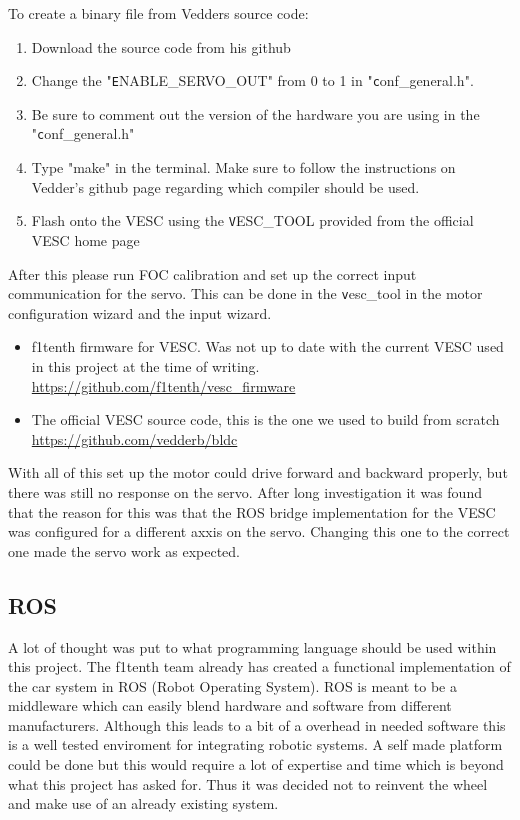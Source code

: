 \documentclass{article}
\begin{document}
	To create a binary file from Vedders source code:

	\begin{enumerate}
		\item Download the source code from his github
		\item Change the "\texttt ENABLE\_SERVO\_OUT" from 0 to 1 in "\texttt conf\_general.h".
		\item Be sure to comment out the version of the hardware you are using in the "\texttt conf\_general.h"
		\item Type "make" in the terminal. Make sure to follow the instructions on Vedder's github page regarding which compiler should be used.
		\item Flash onto the VESC using the \texttt VESC\_TOOL provided from the official VESC home page
	\end{enumerate}

After this please run FOC calibration and set up the correct input communication for the servo. This can be done in the \texttt vesc\_tool in the motor configuration wizard and the input wizard.

	\begin{itemize}
		\item f1tenth firmware for VESC. Was not up to date with the current VESC used in this project at the time of writing. \\
			\url{https://github.com/f1tenth/vesc_firmware} 
	
		\item The official VESC source code, this is the one we used to build from scratch \\
			\url{https://github.com/vedderb/bldc} 
	\end{itemize}
	
	With all of this set up the motor could drive forward and backward properly, but there was still no response on the servo. After long investigation it was found that the reason for this was that the ROS bridge implementation for the VESC was configured for a different axxis on the servo. Changing this one to the correct one made the servo work as expected.

	
	\subsection{ROS}
		A lot of thought was put to what programming language should be used within this project. The f1tenth team already has created a functional implementation of the car system in ROS (Robot Operating System). ROS is meant to be a middleware which can easily blend hardware and software from different manufacturers. Although this leads to a bit of a overhead in needed software this is a well tested enviroment for integrating robotic systems. A self made platform could be done but this would require a lot of expertise and time which is beyond what this project has asked for. Thus it was decided not to reinvent the wheel and make use of an already existing system. \\
\end{document}
